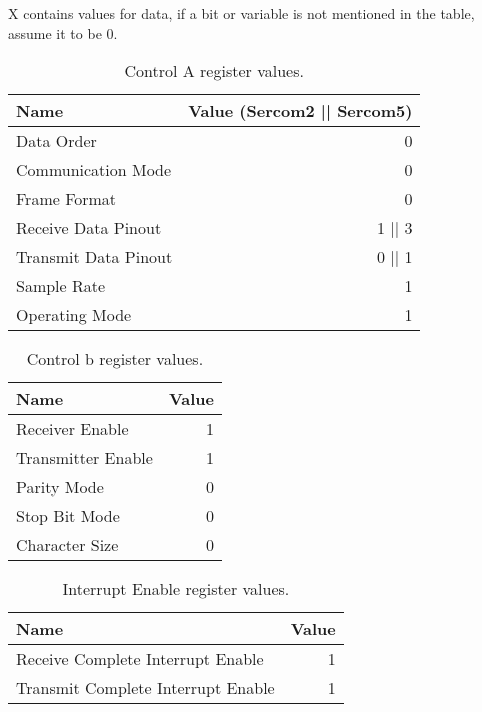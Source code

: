 X contains values for data, if a bit or variable is not mentioned in the table, assume it to be 0.

\begin{table}[H]
	\begin{tabular}{lr}
		\toprule
		Name & Value (Sercom2 || Sercom5) \\
		\midrule
		Data Order & 0 \\ 
		Communication Mode & 0 \\ 
		Frame Format & 0 \\ 
		Receive Data Pinout & 1 || 3 \\ 
		Transmit Data Pinout & 0 || 1 \\ 
		Sample Rate & 1 \\ 
		Operating Mode & 1 \\ 
		\bottomrule
	\end{tabular} 
	\centering
	\caption{Control A register values.}
	\label{tab:UARTControlA}
\end{table}

\begin{table}[H]
	\begin{tabular}{lr}
		\toprule
		Name & Value \\
		\midrule
		Receiver Enable & 1 \\ 
		Transmitter Enable & 1 \\ 
		Parity Mode & 0 \\ 
		Stop Bit Mode & 0 \\ 
		Character Size & 0 \\ 
		\bottomrule
	\end{tabular} 
	\centering
	\caption{Control b register values.}
	\label{tab:UARTControlB}
\end{table}

\begin{table}[H]
	\begin{tabular}{lr}
		\toprule
		Name & Value \\
		\midrule
		Receive Complete Interrupt Enable & 1 \\ 
		Transmit Complete Interrupt Enable & 1 \\ 
		\bottomrule
	\end{tabular} 
	\centering
	\caption{Interrupt Enable register values.}
	\label{tab:UARTINTENSET}
\end{table}

